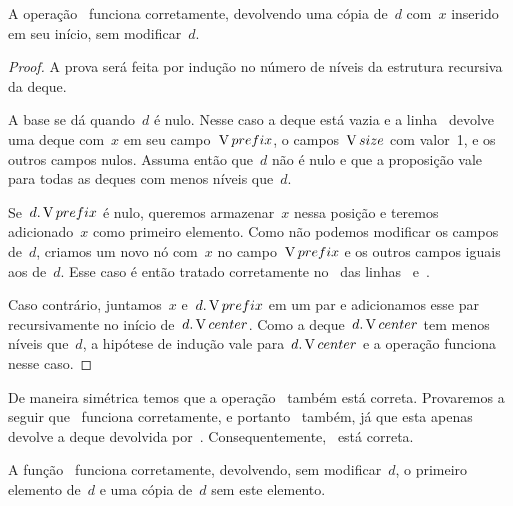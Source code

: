 \documentclass[main.tex]{subfiles}
\begin{document}
\begin{proposition}
A operação~ funciona corretamente, devolvendo uma cópia de~$d$ com~$x$ inserido em seu início, sem modificar~$d$.
\end{proposition}

\begin{proof}
A prova será feita por indução no número de níveis da estrutura recursiva da deque.

A base se dá quando~$d$ é nulo. Nesse caso a deque está vazia e a linha~ devolve uma deque com~$x$ em seu campo~$\operatorname{V}{prefix}$, o campos~$\operatorname{V}{size}$ com valor~1, e os outros campos nulos. Assuma então que~$d$ não é nulo e que a proposição vale para todas as deques com menos níveis que~$d$.

Se~$d.\operatorname{V}{prefix}$ é nulo, queremos armazenar~$x$ nessa posição e teremos adicionado~$x$ como primeiro elemento. Como não podemos modificar os campos de~$d$, criamos um novo nó com~$x$ no campo~$\operatorname{V}{prefix}$ e os outros campos iguais aos de~$d$. Esse caso é então tratado corretamente no~ das linhas~ e~.

Caso contrário, juntamos~$x$ e~$d.\operatorname{V}{prefix}$ em um par e adicionamos esse par recursivamente no início de~$d.\operatorname{V}{center}$. Como a deque~$d.\operatorname{V}{center}$ tem menos níveis que~$d$, a hipótese de indução vale para~$d.\operatorname{V}{center}$ e a operação funciona nesse caso.
\end{proof}

De maneira simétrica temos que a operação~ também está correta. Provaremos a seguir que~ funciona corretamente, e portanto~ também, já que esta apenas devolve a deque devolvida por~. Consequentemente,~ está correta.

\begin{proposition}
A função~ funciona corretamente, devolvendo, sem modificar~$d$, o primeiro elemento de~$d$ e uma cópia de~$d$ sem este elemento.
\end{proposition}
\end{document}
